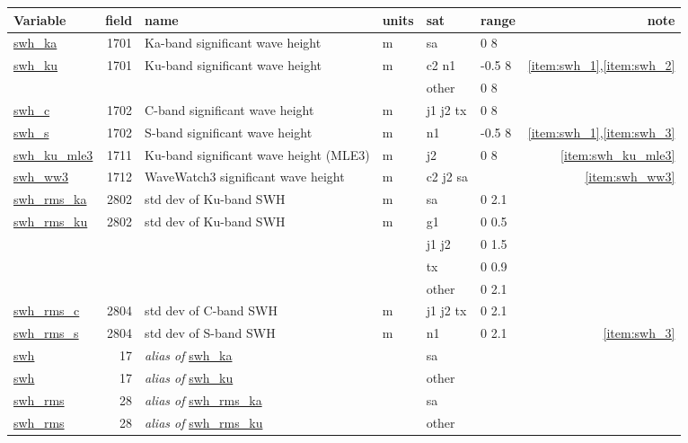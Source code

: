 \documentclass[a4paper,11pt,openany,natbib]{thesis}
\makeatletter
\newcommand\var[1]{\url{#1}\index{variables!#1@\protect\url{#1}}}
\newcommand\alias[1]{\emph{alias of} \var{#1}}
\newenvironment{vartable}{
\begin{table}[ht]
\small
\begin{tabular}{lrllllr}
\hline
Variable & field & name & units & sat & range & note \\
\hline
}{
\hline
\end{tabular}
\end{table}
}
\makeatother
\begin{document}
\begin{vartable}
\var{swh_ka} & 1701 & Ka-band significant wave height & m & sa & 0 8 & \\
\var{swh_ku} & 1701 & Ku-band significant wave height & m & c2 n1 & -0.5 8 & \ref{item:swh_1},\ref{item:swh_2} \\
& & & & other & 0 8 & \\
\var{swh_c} & 1702 & C-band significant wave height & m & j1 j2 tx & 0 8 & \\
\var{swh_s} & 1702 & S-band significant wave height & m & n1 & -0.5 8 & \ref{item:swh_1},\ref{item:swh_3} \\
\var{swh_ku_mle3} & 1711 & Ku-band significant wave height (MLE3) & m & j2 & 0 8 & \ref{item:swh_ku_mle3} \\
\hline
\var{swh_ww3} & 1712 & WaveWatch3 significant wave height & m & c2 j2 sa & & \ref{item:swh_ww3} \\
\hline
\var{swh_rms_ka} & 2802 & std dev of Ku-band SWH & m & sa & 0 2.1 & \\
\var{swh_rms_ku} & 2802 & std dev of Ku-band SWH & m & g1 & 0 0.5 & \\
& & & & j1 j2 & 0 1.5 & \\
& & & & tx & 0 0.9 & \\
& & & & other & 0 2.1 & \\
\var{swh_rms_c} & 2804 & std dev of C-band SWH & m & j1 j2 tx & 0 2.1 & \\
\var{swh_rms_s} & 2804 & std dev of S-band SWH & m & n1 & 0 2.1 & \ref{item:swh_3} \\
\hline
\var{swh} & 17 & \alias{swh_ka} && sa && \\
\var{swh} & 17 & \alias{swh_ku} && other && \\
\hline
\var{swh_rms} & 28 & \alias{swh_rms_ka} && sa && \\
\var{swh_rms} & 28 & \alias{swh_rms_ku} && other && \\
\end{vartable}
\end{document}
